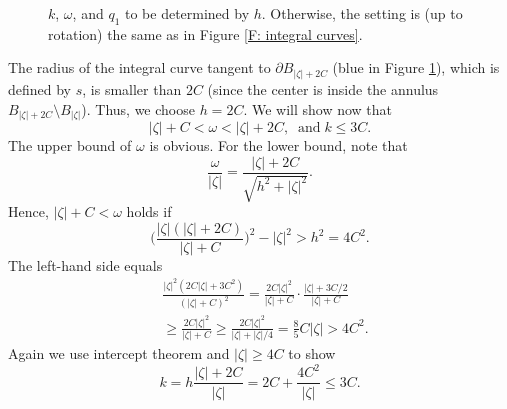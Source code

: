 \documentclass[11pt]{article}
\makeatletter
\renewenvironment{proof}[1][\proofname]{
   \par\pushQED{\qed}\normalfont
   \topsep6\p@\@plus6\p@\relax
   \trivlist\item[\hskip\labelsep\bfseries#1\@addpunct{.}]
   \ignorespaces
}{
   \popQED\endtrivlist\@endpefalse
}
\numberwithin{equation}{section}
\makeatother
\begin{document}
\begin{proof}
\begin{figure}[H]
{      $k$, $\omega$, and $q_1$ to be determined by $h$. 
      Otherwise, the setting is (up to rotation) the same as 
      in Figure \ref{F: integral curves}.}
    \label{F: h leq 2C}
  \end{figure}
  \vspace*{-5mm}
  The radius of the integral curve tangent to 
  $\partial B_{|\zeta|+2C}$ (blue in Figure \ref{F: h leq 2C}),  
  which is defined by $s$, is smaller than $2C$ 
  (since the center is inside the annulus $B_{|\zeta|+2C} \setminus B_{|\zeta|}$).
  Thus, we choose $h = 2C$. We will show now that 
  \begin{equation}\label{eq: tilde h and omega}
    |\zeta|+C < \omega < |\zeta| + 2C, \;\;\text{and} \;
    k \leq 3C.
  \end{equation}
  The upper bound of $\omega$ is obvious. For the lower bound, note that 
  \begin{equation}\nonumber
    \frac{\omega}{|\zeta|} = \frac{|\zeta|+2C}{\sqrt{h^2 + |\zeta|^2}}.
  \end{equation} 
  Hence, $|\zeta| + C < \omega$ holds if 
  \begin{equation}\nonumber
    \bigg( \frac{|\zeta|(|\zeta|+2C)}
        {|\zeta|+ C} \bigg)^2 -|\zeta|^2 > h^2 = 4C^2.
  \end{equation}
  The left-hand side equals 
  \begin{equation}\nonumber
    \begin{split}
      &\frac{|\zeta|^2 (2C|\zeta| + 3C^2)}{(|\zeta|+C)^2}
      = \frac{2C|\zeta|^2}{|\zeta| +C} \cdot \frac{|\zeta|+ 3C/2}{|\zeta|+C}\\
      &\geq \frac{2C|\zeta|^2}{|\zeta| +C}
      \geq \frac{2C|\zeta|^2}{|\zeta| + |\zeta|/4} 
      = \frac{8}{5} C |\zeta| 
      > 4 C^2. 
    \end{split}
  \end{equation} 
  Again we use intercept theorem and $|\zeta| \geq 4C$ to show
  \begin{equation}\nonumber
    k = h \frac{|\zeta|+2C}{|\zeta|} 
      = 2C + \frac{4C^2}{|\zeta|} 
      \leq 3C.
  \end{equation}  


\end{proof}
\end{document}
